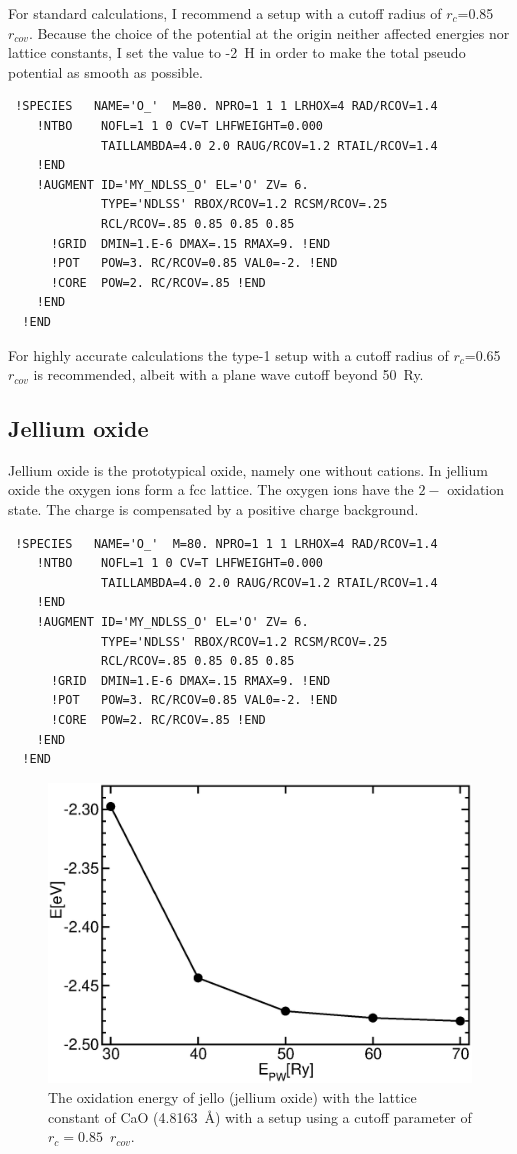 \documentclass[11pt,a4paper]{report}
\begin{document}
For standard calculations, I recommend a setup with a cutoff radius of
$r_c$=0.85~$r_{cov}$. Because the choice of the potential at the
origin neither affected energies nor lattice constants, I set the
value to -2~H in order to make the total pseudo potential as smooth
as possible.
\begin{verbatim}
 !SPECIES   NAME='O_'  M=80. NPRO=1 1 1 LRHOX=4 RAD/RCOV=1.4
    !NTBO    NOFL=1 1 0 CV=T LHFWEIGHT=0.000
             TAILLAMBDA=4.0 2.0 RAUG/RCOV=1.2 RTAIL/RCOV=1.4 
    !END 
    !AUGMENT ID='MY_NDLSS_O' EL='O' ZV= 6.
             TYPE='NDLSS' RBOX/RCOV=1.2 RCSM/RCOV=.25
             RCL/RCOV=.85 0.85 0.85 0.85
      !GRID  DMIN=1.E-6 DMAX=.15 RMAX=9. !END
      !POT   POW=3. RC/RCOV=0.85 VAL0=-2. !END
      !CORE  POW=2. RC/RCOV=.85 !END
    !END
  !END
\end{verbatim}

 For highly accurate calculations the
type-1 setup with a cutoff radius of $r_c$=0.65~$r_{cov}$ is
recommended, albeit with a plane wave cutoff beyond 50~Ry.


\subsection{Jellium oxide}
Jellium oxide is the prototypical oxide, namely one without
cations. In jellium oxide the oxygen ions form a fcc lattice. The
oxygen ions have the $2-$ oxidation state. The charge is compensated
by a positive charge background.

{\tiny\begin{verbatim}
 !SPECIES   NAME='O_'  M=80. NPRO=1 1 1 LRHOX=4 RAD/RCOV=1.4
    !NTBO    NOFL=1 1 0 CV=T LHFWEIGHT=0.000
             TAILLAMBDA=4.0 2.0 RAUG/RCOV=1.2 RTAIL/RCOV=1.4 
    !END 
    !AUGMENT ID='MY_NDLSS_O' EL='O' ZV= 6.
             TYPE='NDLSS' RBOX/RCOV=1.2 RCSM/RCOV=.25
             RCL/RCOV=.85 0.85 0.85 0.85
      !GRID  DMIN=1.E-6 DMAX=.15 RMAX=9. !END
      !POT   POW=3. RC/RCOV=0.85 VAL0=-2. !END
      !CORE  POW=2. RC/RCOV=.85 !END
    !END
  !END
\end{verbatim}}

\begin{figure}[h!]
\begin{center}
\includegraphics[width=0.45\linewidth,clip=true]
{Figs/Jello/eoxjello.eps}
\end{center}
\caption{\label{eoxjello} The oxidation energy of jello (jellium
  oxide) with the lattice constant of CaO (4.8163~\AA) with a setup
  using a cutoff parameter of $r_c=0.85$~$r_{cov}$.  }
\end{figure}
\end{document}
